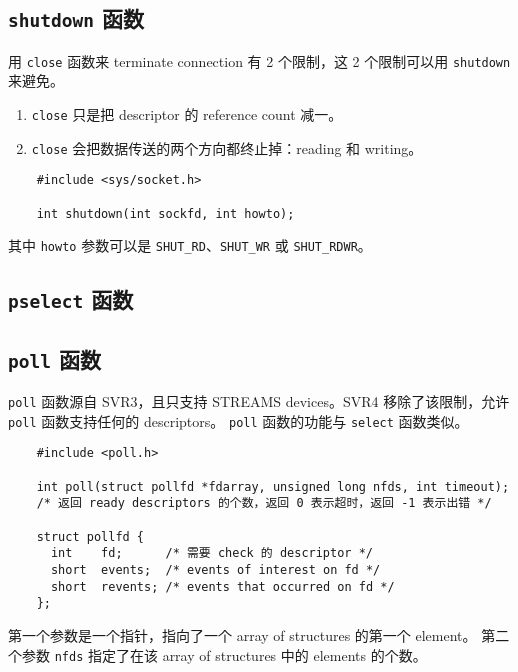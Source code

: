   \subsection{\texttt{shutdown} 函数}

    用 \texttt{close} 函数来 terminate connection 有 2 个限制，这 2 个限制可以用 \texttt{shutdown} 来避免。

    \begin{enumerate}
      \item \texttt{close} 只是把 descriptor 的 reference count 减一。
      \item \texttt{close} 会把数据传送的两个方向都终止掉：reading 和 writing。
    \end{enumerate}

    \begin{verbatim}
    #include <sys/socket.h>

    int shutdown(int sockfd, int howto);
    \end{verbatim}

    其中 \texttt{howto} 参数可以是 \texttt{SHUT\_RD}、\texttt{SHUT\_WR} 或 \texttt{SHUT\_RDWR}。

  \subsection{\texttt{pselect} 函数}

  \subsection{\texttt{poll} 函数}

    \texttt{poll} 函数源自 SVR3，且只支持 STREAMS devices。SVR4 移除了该限制，允许 \texttt{poll} 函数支持任何的 descriptors。
    \texttt{poll} 函数的功能与 \texttt{select} 函数类似。

    \begin{verbatim}
    #include <poll.h>

    int poll(struct pollfd *fdarray, unsigned long nfds, int timeout);
    /* 返回 ready descriptors 的个数，返回 0 表示超时，返回 -1 表示出错 */

    struct pollfd {
      int    fd;      /* 需要 check 的 descriptor */
      short  events;  /* events of interest on fd */
      short  revents; /* events that occurred on fd */
    };
    \end{verbatim}
    
    第一个参数是一个指针，指向了一个 array of structures 的第一个 element。
    第二个参数 \texttt{nfds} 指定了在该 array of structures 中的 elements 的个数。